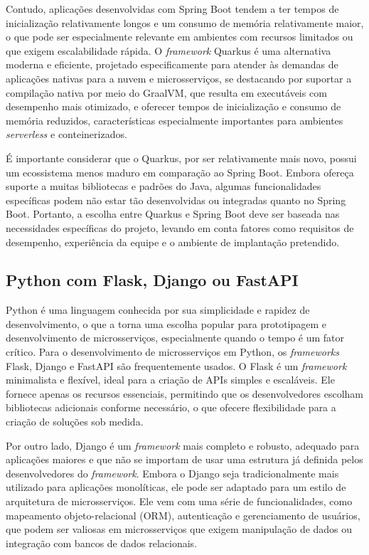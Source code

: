 Contudo, aplicações desenvolvidas com Spring Boot tendem a ter tempos de inicialização relativamente longos e um consumo de memória relativamente maior, o que pode ser especialmente relevante em ambientes com recursos limitados ou que exigem escalabilidade rápida. O \emph{framework} Quarkus é uma alternativa moderna e eficiente, projetado especificamente para atender às demandas de aplicações nativas para a nuvem e microsserviços, se destacando por suportar a compilação nativa por meio do GraalVM, que resulta em executáveis com desempenho mais otimizado, e oferecer tempos de inicialização e consumo de memória reduzidos, características especialmente importantes para ambientes \emph{serverless} e conteinerizados. \cite{quarkus_redhat}

É importante considerar que o Quarkus, por ser relativamente mais novo, possui um ecossistema menos maduro em comparação ao Spring Boot. Embora ofereça suporte a muitas bibliotecas e padrões do Java, algumas funcionalidades específicas podem não estar tão desenvolvidas ou integradas quanto no Spring Boot. Portanto, a escolha entre Quarkus e Spring Boot deve ser baseada nas necessidades específicas do projeto, levando em conta fatores como requisitos de desempenho, experiência da equipe e o ambiente de implantação pretendido.

\subsection{Python com Flask, Django ou FastAPI}

Python é uma linguagem conhecida por sua simplicidade e rapidez de desenvolvimento, o que a torna uma escolha popular para prototipagem e desenvolvimento de microsserviços, especialmente quando o tempo é um fator crítico. Para o desenvolvimento de microsserviços em Python, os \emph{frameworks} Flask, Django e FastAPI são frequentemente usados. O Flask é um \emph{framework} minimalista e flexível, ideal para a criação de APIs simples e escaláveis. Ele fornece apenas os recursos essenciais, permitindo que os desenvolvedores escolham bibliotecas adicionais conforme necessário, o que ofecere flexibilidade para a criação de soluções sob medida. 
\cite{flask}

Por outro lado, Django é um \emph{framework} mais completo e robusto, adequado para aplicações maiores e que não se importam de usar uma estrutura já definida pelos desenvolvedores do \emph{framework}. Embora o Django seja tradicionalmente mais utilizado para aplicações monolíticas, ele pode ser adaptado para um estilo de arquitetura de microsserviços. Ele vem com uma série de funcionalidades, como mapeamento objeto-relacional (ORM), autenticação e gerenciamento de usuários, que podem ser valiosas em microsserviços que exigem manipulação de dados ou integração com bancos de dados relacionais. 
\cite{django}

